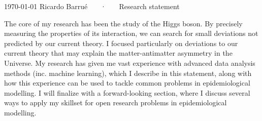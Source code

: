 \documentclass[11pt, a4paper]{awesome-cv}
\begin{document}
\makecvheader[R]

\makecvfooter
  {\today}
  {Ricardo Barrué ~~~·~~~ Research statement}
  {}

\makelettertitle

\begin{cvletter}

The core of my research has been the study of the Higgs boson. By precisely measuring the properties of its interaction, we can search for small deviations not predicted by our current theory. I focused particularly on deviations to our current theory that may explain the matter-antimatter asymmetry in the Universe. My research has given me vast experience with advanced data analysis methods (inc. machine learning), which I describe in this statement, along with how this experience can be used to tackle common problems in epidemiological modelling. I will finalize with a forward-looking section, where I discuss several ways to apply my skillset for open research problems in epidemiological modelling.


% 


\end{cvletter}
\end{document}
